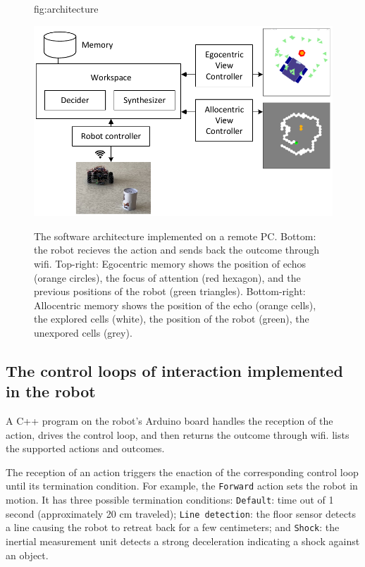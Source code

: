 \documentclass[pmlr]{jmlr}%
\begin{document}
\begin{figure}[htbp]
	\floatconts
	{fig:architecture}
	{\caption{The software architecture implemented on a remote PC. 
			Bottom: the robot recieves the action and sends back the outcome through wifi.
			Top-right: Egocentric memory shows the position of echos (orange circles), the focus of attention (red hexagon), and the previous positions of the robot (green triangles).
			Bottom-right: Allocentric memory shows the position of the echo (orange cells), the explored cells (white), the position of the robot (green), the unexpored cells (grey).}}
	{\includegraphics[width=0.8\linewidth]{images/Figure_2_Architecture}}
\end{figure}


\subsection{The control loops of interaction implemented in the robot}

A C++ program on the robot's Arduino board handles the reception of the action, drives the control loop, and then returns the outcome through wifi. 
 lists the supported actions and outcomes.

The reception of an action triggers the enaction of the corresponding control loop until its termination condition.
For example, the \texttt{Forward} action sets the robot in motion. 
It has three possible termination conditions: 
\texttt{Default}: time out of 1 second (approximately 20 cm traveled);
\texttt{Line detection}: the floor sensor detects a line causing the robot to retreat back for a few centimeters; and
\texttt{Shock}: the inertial measurement unit detects a strong deceleration indicating a shock against an object.
\end{document}
